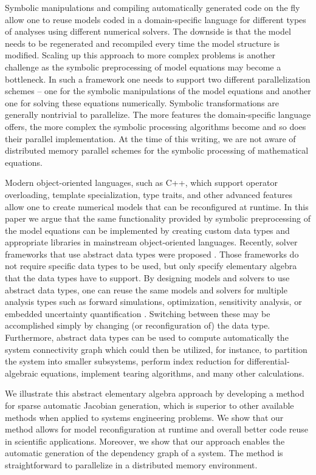 \documentclass[10pt]{ijnam}
\theoremstyle{definition}
\begin{document}
Symbolic manipulations and 
compiling automatically generated code on the fly allow one to reuse models coded in a 
domain-specific language for different types of analyses using 
different numerical solvers. The downside is that the model needs to
be regenerated and recompiled every time the model structure is modified. Scaling up this 
approach to more complex problems is another 
challenge as the symbolic preprocessing of model equations may become a bottleneck. 
In such a framework 
one needs to support two different parallelization schemes -- one for the symbolic 
manipulations of the model equations and another one for solving these equations 
numerically. Symbolic transformations are generally nontrivial to parallelize. The more 
features the domain-specific language offers, the more complex the symbolic
processing algorithms become and so does their parallel implementation.
At the time of this writing, we are not aware of distributed memory parallel schemes for the
symbolic processing of mathematical equations. 

Modern object-oriented languages, such as C++, which support operator overloading, 
template specialization, type traits, and other advanced features allow one to create numerical 
models that can be reconfigured at runtime. In this paper we argue that the same functionality
provided by symbolic 
preprocessing of the model equations can be implemented by creating custom data types and
appropriate libraries in mainstream object-oriented languages.
Recently, solver frameworks that use abstract data types were proposed \cite{baker2012}. 
Those frameworks do not require specific data types to be used, but only specify 
elementary algebra that the data types have to support. By designing models and solvers 
to use abstract data types, one can reuse the same models and solvers for multiple analysis types
such as forward simulations, optimization, sensitivity analysis, or embedded uncertainty 
quantification \cite{constantine2014efficient}. Switching between these may be accomplished 
simply by changing (or reconfiguration of) the data type. Furthermore, abstract data types
can be used to compute automatically the system 
connectivity graph which could then be utilized, for instance, to partition the system
into smaller subsystems, perform index reduction for differential-algebraic equations, 
implement tearing algorithms, and many other calculations.

We illustrate this abstract elementary algebra approach by developing a method for 
sparse automatic Jacobian generation, which 
is superior to other available methods when applied to systems engineering problems. 
We show that our method allows for model reconfiguration at runtime 
and overall better code reuse in scientific applications. Moreover,
we show that our approach enables the automatic generation of the dependency graph 
of a system. The method is straightforward to parallelize in a distributed memory environment.
\end{document}
